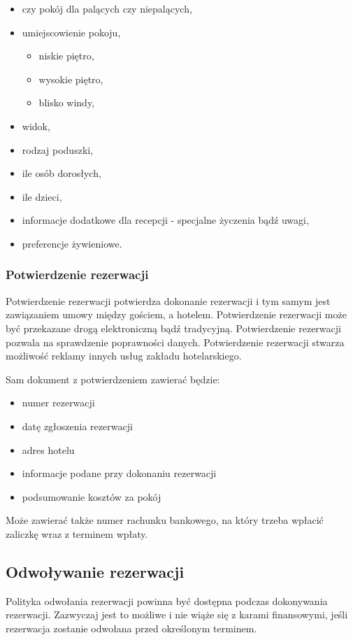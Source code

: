 \documentclass[a4paper,onecolumn,oneside,11pt,wide,floatssmall]{mwrep}
\theoremstyle{definition}
\theoremstyle{plain}%
\theoremstyle{remark}
\begin{document}
\begin{itemize}
  \item czy pokój dla palących czy niepalących,
  \item umiejscowienie pokoju,
  \begin{itemize}
    \item niskie piętro,
    \item wysokie piętro,
    \item blisko windy,
  \end{itemize}
  \item widok,
  \item rodzaj poduszki,
  \item ile osób dorosłych,
  \item ile dzieci,
  \item informacje dodatkowe dla recepcji - specjalne życzenia bądź uwagi,
  \item preferencje żywieniowe.
\end{itemize}


\subsubsection{Potwierdzenie rezerwacji}
Potwierdzenie rezerwacji potwierdza dokonanie rezerwacji i tym samym jest 
zawiązaniem umowy między gościem, a hotelem. Potwierdzenie rezerwacji może 
być przekazane drogą elektroniczną bądź tradycyjną. Potwierdzenie rezerwacji 
pozwala na sprawdzenie poprawności danych. Potwierdzenie rezerwacji stwarza 
możliwość reklamy innych usług zakładu hotelarskiego. 

Sam dokument z potwierdzeniem zawierać będzie:
\begin{itemize}
  \item numer rezerwacji
  \item datę zgłoszenia rezerwacji
  \item adres hotelu
  \item informacje podane przy dokonaniu rezerwacji
  \item podsumowanie kosztów za pokój
\end{itemize}

Może zawierać także numer rachunku bankowego, na który trzeba wpłacić 
zaliczkę wraz z terminem wpłaty.

\subsection{Odwoływanie rezerwacji}
Polityka odwołania rezerwacji powinna być dostępna podczas dokonywania 
rezerwacji. Zazwyczaj jest to możliwe i nie wiąże się z karami finansowymi, 
jeśli rezerwacja zostanie odwołana przed określonym terminem. 
\end{document}

